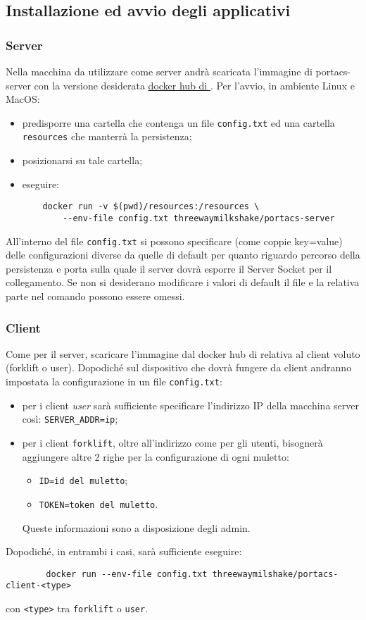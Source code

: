 \subsection{Installazione ed avvio degli applicativi}
    \subsubsection{Server}
    Nella macchina da utilizzare come server andrà scaricata l'immagine di portacs-server con la versione desiderata \href{https://hub.docker.com/r/threewaymilkshake}{docker hub di \group}.
    Per l'avvio, in ambiente Linux e MacOS:
    \begin{itemize}
        \item predisporre una cartella che contenga un file \texttt{config.txt} ed una cartella \texttt{resources} che manterrà la persistenza;
        \item posizionarsi su tale cartella;
        \item eseguire:
    \begin{verbatim}
    docker run -v $(pwd)/resources:/resources \
        --env-file config.txt threewaymilkshake/portacs-server
    \end{verbatim}
    \end{itemize}
    All'interno del file \texttt{config.txt} si possono specificare (come coppie key=value) delle configurazioni diverse da quelle di default per quanto riguardo percorso della persistenza e porta sulla quale il server dovrà esporre il Server Socket per il collegamento. Se non si desiderano modificare i valori di default il file e la relativa parte nel comando possono essere omessi.

    \subsubsection{Client}
    Come per il server, scaricare l'immagine dal docker hub di \group{} relativa al client voluto (forklift o user). Dopodiché sul dispositivo che dovrà fungere da client andranno impostata la configurazione in un file \texttt{config.txt}:
    \begin{itemize}
        \item per i client \textit{user} sarà sufficiente specificare l'indirizzo IP della macchina server così: \texttt{SERVER\_ADDR=ip};
        \item per i client \texttt{forklift}, oltre all'indirizzo come per gli utenti, bisognerà aggiungere altre 2 righe per la configurazione di ogni muletto:
        \begin{itemize}
            \item \texttt{ID=id del muletto};
            \item \texttt{TOKEN=token del muletto}.
        \end{itemize}
        Queste informazioni sono a disposizione degli admin.
    \end{itemize}

    Dopodiché, in entrambi i casi, sarà sufficiente eseguire:
    \begin{verbatim}
        docker run --env-file config.txt threewaymilshake/portacs-client-<type>
    \end{verbatim}
    con \texttt{<type>} tra \texttt{forklift} o \texttt{user}.


